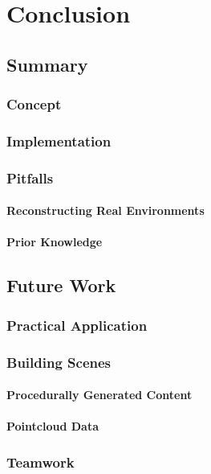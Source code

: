 \chapter{Conclusion}

\section{Summary}

\subsection{Concept}

\subsection{Implementation}

\subsection{Pitfalls}
\subsubsection{Reconstructing Real Environments}
\subsubsection{Prior Knowledge}

\section{Future Work}
\subsection{Practical Application}

\subsection{Building Scenes}
\subsubsection{Procedurally Generated Content}

\subsubsection{Pointcloud Data}

\subsection{Teamwork}




